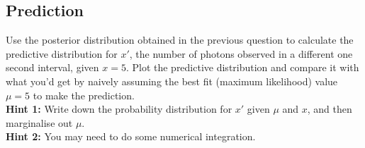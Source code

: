 \documentclass[a4paper, 11pt]{article}
\begin{document}
\subsection{Prediction}
Use the posterior distribution obtained in the previous question to calculate
the predictive distribution for $x'$, the number of photons observed in a
different one second interval, given $x=5$. Plot the predictive distribution
and compare it with what you'd get by naively assuming the best fit
(maximum likelihood) value $\mu=5$ to make the prediction.\\

{\bf Hint 1: }Write down the probability distribution for $x'$ given
$\mu$ and $x$, and then marginalise out $\mu$.\\

{\bf Hint 2: }You may need to do some numerical integration.
\end{document}
